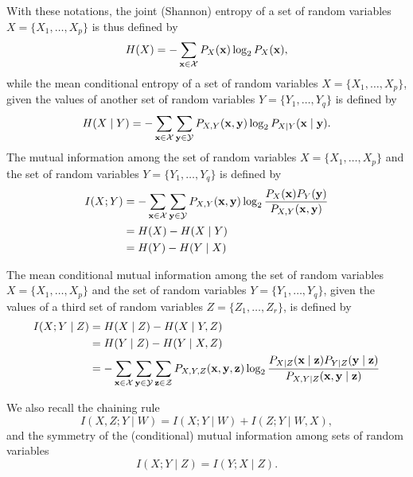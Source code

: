 With these notations, the joint (Shannon) entropy of a set of random variables
$X =\{X_{1}, \ldots , X_{p}\}$ is thus defined by
\begin{equation}\label{eqn:6:entropy}
H(X)  = - \sum_{\mathbf{x} \in {\cal X}}P_{X} (\mathbf{x})\log_{2}P_{X}(\mathbf{x}),
\end{equation}
while the mean conditional entropy of a set of random variables $X = \{X_{1},
\ldots , X_{p}\}$, given the values of another set of random variables
$Y=\{Y_{1}, \ldots , Y_{q}\}$ is defined by
\begin{equation}\label{eqn:6:entropy-cond}
H(X\mid Y) = - \sum_{\mathbf{x} \in {\cal X}} \sum_{\mathbf{y} \in {\cal Y}} P_{X, Y} (\mathbf{x}, \mathbf{y}) \log_{2} P_{X \mid Y} (\mathbf{x} \mid \mathbf{y}).
 \end{equation}
The mutual information among the set of random variables $X =\{X_{1}, \ldots ,
X_{p}\}$ and the set of random variables $Y=\{Y_{1}, \ldots , Y_{q}\}$ is
defined by
 \begin{align}\label{eqn:6:mi}
 I(X; Y) &= - \sum_{\mathbf{x} \in {\cal X}} \sum_{\mathbf{y} \in {\cal Y}} P_{X, Y} (\mathbf{x}, \mathbf{y}) \log_{2} \frac{P_{X}(\mathbf{x}) P_{Y}(\mathbf{y})}{P_{X,Y}(\mathbf{x},\mathbf{y})} \\
 &= H(X) - H(X \mid Y) \nonumber \\
 &=  H(Y) - H(Y \mid X) \nonumber
 \end{align}

The mean conditional mutual information among the set of random variables $X
=\{X_{1}, \ldots , X_{p}\}$ and the set of random variables $Y=\{Y_{1}, \ldots
, Y_{q}\}$, given the values of a third set of random variables $Z=\{Z_{1},
\ldots , Z_{r}\}$, is defined by
 \begin{align}
 I(X; Y \mid Z) &= H(X \mid Z) - H(X \mid Y, Z)\\
 & = H(Y \mid Z) - H(Y \mid X, Z) \nonumber\\
& = - \sum_{\mathbf{x} \in {\cal X}} \sum_{\mathbf{y} \in {\cal Y}} \sum_{\mathbf{z} \in {\cal Z}} P_{X, Y, Z} (\mathbf{x}, \mathbf{y}, \mathbf{z}) \log_{2} \frac{P_{X \mid Z}(\mathbf{x} \mid \mathbf{z}) P_{Y\mid Z}(\mathbf{y} \mid \mathbf{z})}{P_{X,Y \mid Z}(\mathbf{x},\mathbf{y} \mid \mathbf{z})}\nonumber
\end{align}

We also recall the chaining rule
\begin{equation}
I(X, Z ; Y \mid W ) = I(X; Y \mid W  ) + I( Z ; Y \mid W, X),
\end{equation}
and the symmetry of the (conditional) mutual information among sets of random variables
\begin{equation}
I(X ; Y \mid Z) = I(Y ;  X  \mid Z).
\end{equation}



